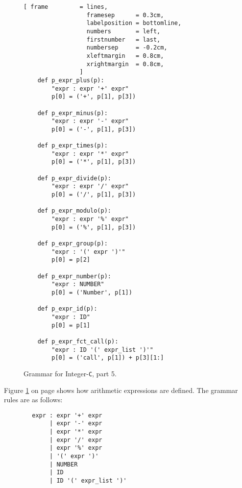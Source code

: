 \begin{figure}[!ht]
\centering
\begin{Verbatim}[ frame         = lines, 
                  framesep      = 0.3cm, 
                  labelposition = bottomline,
                  numbers       = left,
                  firstnumber   = last,
                  numbersep     = -0.2cm,
                  xleftmargin   = 0.8cm,
                  xrightmargin  = 0.8cm,
                ]
    def p_expr_plus(p):
        "expr : expr '+' expr"
        p[0] = ('+', p[1], p[3])
        
    def p_expr_minus(p):
        "expr : expr '-' expr"
        p[0] = ('-', p[1], p[3])
        
    def p_expr_times(p):
        "expr : expr '*' expr"
        p[0] = ('*', p[1], p[3])
        
    def p_expr_divide(p):
        "expr : expr '/' expr"
        p[0] = ('/', p[1], p[3])
        
    def p_expr_modulo(p):
        "expr : expr '%' expr"
        p[0] = ('%', p[1], p[3])

    def p_expr_group(p):
        "expr : '(' expr ')'"
        p[0] = p[2]
    
    def p_expr_number(p):
        "expr : NUMBER"
        p[0] = ('Number', p[1])
    
    def p_expr_id(p):
        "expr : ID"
        p[0] = p[1]
        
    def p_expr_fct_call(p):
        "expr : ID '(' expr_list ')'"
        p[0] = ('call', p[1]) + p[3][1:]
\end{Verbatim}
\vspace*{-0.3cm}
\caption{Grammar for Integer-\texttt{C}, part 5.}
\label{fig:Compiler.ipynb-5}
\end{figure}
\noindent
Figure \ref{fig:Compiler.ipynb-5} on page \pageref{fig:Compiler.ipynb-5} shows how arithmetic expressions
are defined.  The grammar rules are as follows:

\begin{verbatim}
        expr : expr '+' expr
             | expr '-' expr
             | expr '*' expr
             | expr '/' expr
             | expr '%' expr
             | '(' expr ')'
             | NUMBER
             | ID
             | ID '(' expr_list ')'
\end{verbatim}

